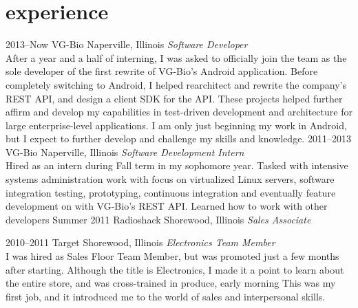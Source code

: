 \documentclass[]{friggeri-cv} %
\begin{document}

\section{experience}

\begin{entrylist}
\entry
{2013--Now}
{VG-Bio}
{Naperville, Illinois}
{\emph{Software Developer} \\
    After a year and a half of interning, I was asked to officially join the team as the sole developer of the first rewrite of VG-Bio's Android application.
    Before completely switching to Android, I helped rearchitect and rewrite the company's REST API, and design a client SDK for the API.
    These projects helped further affirm and develop my capabilities in test-driven development and architecture for large enterprise-level applications.
    I am only just beginning my work in Android, but I expect to further develop and challenge my skills and knowledge.
}
\entry
{2011--2013}
{VG-Bio}
{Naperville, Illinois}
{\emph{Software Development Intern} \\
    Hired as an intern during Fall term in my sophomore year.
    Tasked with intensive systems administration work with focus on virtualized Linux servers, software integration testing, prototyping, continuous integration and eventually feature development on with VG-Bio's REST API.
    Learned how to work with other developers}
\entry
{Summer 2011}
{Radioshack}
{Shorewood, Illinois}
{\emph{Sales Associate} \\
}

\entry
{2010--2011}
{Target}
{Shorewood, Illinois}
{\emph{Electronics Team Member} \\
I was hired as Sales Floor Team Member, but was promoted just a few months after starting.
Although the title is Electronics, I made it a point to learn about the entire store, and was cross-trained in produce, early morning 
This was my first job, and it introduced me to the world of sales and interpersonal skills.}
\end{entrylist}

\end{document}
